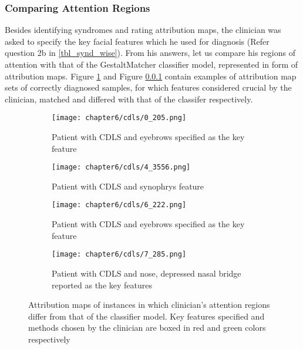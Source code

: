 \documentclass[../report.tex]{subfiles}
\begin{document}
  \subsubsection{Comparing Attention Regions}
   Besides identifying syndromes and rating attribution maps, the clinician was asked to specify the key facial features which he used for diagnosis (Refer question 2b in \ref{tbl_synd_wise}). From his answers, let us compare his regions of attention with that of the GestaltMatcher classifier model, represented in form of attribution maps.  Figure \ref{fig_match_cl_maps} and Figure \ref{}  contain examples of attribution map sets of correctly diagnosed samples, for which features considered crucial by the clinician, matched and differed with that of the classifer respectively.	
		\begin{figure}[H]
		\centering			
		\begin{subfigure}[t]{1\textwidth}
			\centering
			\texttt{[image: chapter6/cdls/0\_205.png]}
			\caption{Patient with CDLS and eyebrows specified as the key feature}
		\end{subfigure}
		\begin{subfigure}[t]{1\textwidth}
			\centering
			\texttt{[image: chapter6/cdls/4\_3556.png]}
			\caption{Patient with CDLS and synophrys feature}
		\end{subfigure}
		\begin{subfigure}[t]{1\textwidth}
			\centering
			\texttt{[image: chapter6/cdls/6\_222.png]}
			\caption{Patient with CDLS and eyebrows specified as the key feature}
		\end{subfigure}
		\begin{subfigure}[t]{1\textwidth}
			\centering
			\texttt{[image: chapter6/cdls/7\_285.png]}
			\caption{Patient with CDLS and nose, depressed nasal bridge reported as the key features}
		\end{subfigure}
		\caption[Attribution maps of instances in which clinician's attention regions differ from that of the classifier model]{Attribution maps of instances in which clinician's attention regions differ from that of the classifier model. Key features specified and methods chosen by the clinician are boxed in red and green colors respectively}
	\label{fig_match_cl_maps}
	\end{figure}
\end{document}
